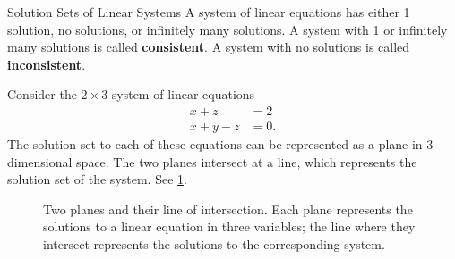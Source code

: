 \documentclass{article}
\begin{document}
\begin{calloutbox}{Solution Sets of Linear Systems}\label{box:solution-sets}
A system of linear equations has either 1 solution, no solutions, or infinitely many solutions. A system with 1 or infinitely many solutions is called \textbf{consistent}. A system with no solutions is called \textbf{inconsistent}.
\end{calloutbox}

\begin{example}
    Consider the \(2 \times 3\) system of linear equations
    \begin{align*}
        x+z&=2 \\
        x+y-z&=0.
    \end{align*}
    The solution set to each of these equations can be represented as a plane in 3-dimensional space. The two planes intersect at a line, which represents the solution set of the system. See \cref{fig:linear-system-2}.
\begin{figure}[H]
    \centering
    \caption{Two planes and their line of intersection. Each plane represents the solutions to a linear equation in three variables; the line where they intersect represents the solutions to the corresponding system.}
    \label{fig:linear-system-2}
\end{figure}
\end{example}
\end{document}
